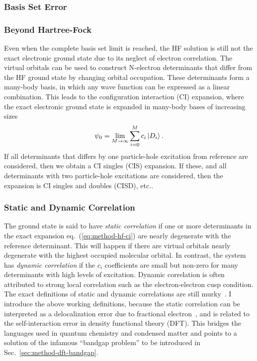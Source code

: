 \subsubsection{Basis Set Error}

\subsubsection{Beyond Hartree-Fock}
Even when the complete basis set limit is reached, the HF solution is still not the exact electronic ground state due to its neglect of electron correlation.
The virtual orbitals can be used to construct N-electron determinants that differ from the HF ground state by changing orbital occupation.
These determinants form a many-body basis, in which any wave function can be expressed as a linear combination.
This leads to the configuration interaction (CI) expansion, where the exact electronic ground state is expanded in many-body bases of increasing sizes
\begin{align} \label{eq:method-hf-ci}
\psi_0 = \lim\limits_{M\rightarrow\infty}\sum\limits_{i=0}^{M} c_i \ket{D_i}.
\end{align}
If all determinants that differs by one particle-hole excitation from reference are considered, then we obtain a CI singles (CIS) expansion. If these, and all determinants with two particle-hole excitations are considered, then the expansion is CI singles and doubles (CISD), etc..

\subsubsection{Static and Dynamic Correlation}
The ground state is said to have \textit{static correlation} if one or more determinants in the exact expansion eq.~(\ref{eq:method-hf-ci}) are nearly degenerate with the reference determinant.
This will happen if there are virtual orbitals nearly degenerate with the highest occupied molecular orbital.
In contrast, the system has \textit{dynamic correlation} if the $c_i$ coefficients are small but non-zero for many determinants with high levels of excitation.
Dynamic correlation is often attributed to strong local correlation such as the electron-electron cusp condition.
The exact definitions of static and dynamic correlations are still murky~\cite{Benavides-Riveros2017}.
I introduce the above working definitions, because the static correlation can be interpreted as a delocalization error due to fractional electron~\cite{Cohen2008}, and is related to the self-interaction error in density functional theory (DFT).
This bridges the languages used in quantum chemistry and condensed matter and points to a solution of the infamous ``bandgap problem'' to be introduced in  Sec.~\ref{sec:method-dft-bandgap}.

